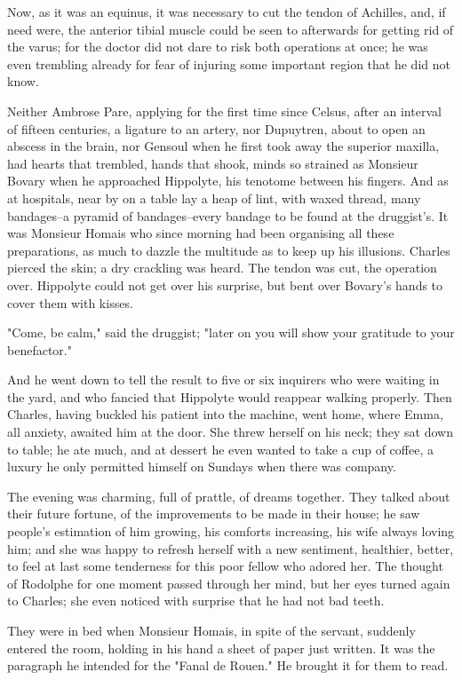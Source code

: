 \documentclass[11pt,twocolumn]{ltugboat}
\begin{document}
Now, as it was an equinus, it was necessary to cut the tendon of
Achilles, and, if need were, the anterior tibial muscle could be seen to
afterwards for getting rid of the varus; for the doctor did not dare to
risk both operations at once; he was even trembling already for fear of
injuring some important region that he did not know.

Neither Ambrose Pare, applying for the first time since Celsus, after an
interval of fifteen centuries, a ligature to an artery, nor Dupuytren,
about to open an abscess in the brain, nor Gensoul when he first took
away the superior maxilla, had hearts that trembled, hands that shook,
minds so strained as Monsieur Bovary when he approached Hippolyte, his
tenotome between his fingers. And as at hospitals, near by on a table
lay a heap of lint, with waxed thread, many bandages--a pyramid of
bandages--every bandage to be found at the druggist's. It was Monsieur
Homais who since morning had been organising all these preparations,
as much to dazzle the multitude as to keep up his illusions. Charles
pierced the skin; a dry crackling was heard. The tendon was cut, the
operation over. Hippolyte could not get over his surprise, but bent over
Bovary's hands to cover them with kisses.

"Come, be calm," said the druggist; "later on you will show your
gratitude to your benefactor."

And he went down to tell the result to five or six inquirers who were
waiting in the yard, and who fancied that Hippolyte would reappear
walking properly. Then Charles, having buckled his patient into the
machine, went home, where Emma, all anxiety, awaited him at the door.
She threw herself on his neck; they sat down to table; he ate much,
and at dessert he even wanted to take a cup of coffee, a luxury he only
permitted himself on Sundays when there was company.

The evening was charming, full of prattle, of dreams together. They
talked about their future fortune, of the improvements to be made in
their house; he saw people's estimation of him growing, his comforts
increasing, his wife always loving him; and she was happy to refresh
herself with a new sentiment, healthier, better, to feel at last some
tenderness for this poor fellow who adored her. The thought of Rodolphe
for one moment passed through her mind, but her eyes turned again to
Charles; she even noticed with surprise that he had not bad teeth.

They were in bed when Monsieur Homais, in spite of the servant, suddenly
entered the room, holding in his hand a sheet of paper just written. It
was the paragraph he intended for the "Fanal de Rouen." He brought it
for them to read.
\end{document}
